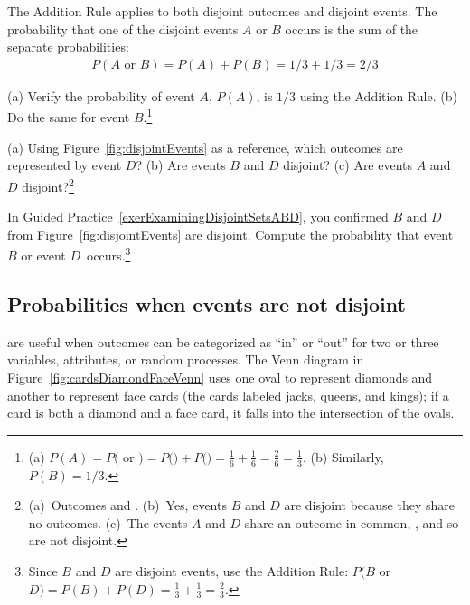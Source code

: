 The Addition Rule applies to both disjoint outcomes and disjoint events. The probability that one of the disjoint events $A$ or $B$ occurs is the sum of the separate probabilities:
\begin{align*}
P(A\text{ or }B) = P(A) + P(B) = 1/3 + 1/3 = 2/3
\end{align*}

\begin{exercise}
(a) Verify the probability of event $A$, $P(A)$, is $1/3$ using the Addition Rule. (b) Do the same for event $B$.\footnote{(a) $P(A) = P($ or $) = P($$) + P($$) = \frac{1}{6} + \frac{1}{6} = \frac{2}{6} = \frac{1}{3}$. (b) Similarly, $P(B) = 1/3$.}
\end{exercise}

\begin{exercise} \label{exerExaminingDisjointSetsABD}
(a) Using Figure~\ref{fig:disjointEvents} as a reference, which outcomes are represented by event $D$? (b) Are events $B$ and $D$ disjoint? (c) Are events $A$ and $D$ disjoint?\footnote{(a)~Outcomes  and . (b)~Yes, events $B$ and $D$ are disjoint because they share no outcomes. (c)~The events $A$ and $D$ share an outcome in common, , and so are not disjoint.}
\end{exercise}

\begin{exercise}
In Guided Practice~\ref{exerExaminingDisjointSetsABD}, you confirmed $B$ and $D$ from Figure~\ref{fig:disjointEvents} are disjoint. Compute the probability that event $B$ or event $D$~occurs.\footnote{Since $B$ and $D$ are disjoint events, use the Addition Rule: $P(B$ or $D) = P(B) + P(D) = \frac{1}{3} + \frac{1}{3} = \frac{2}{3}$.}
\end{exercise}



\subsection{Probabilities when events are not disjoint}

 are useful when outcomes can be categorized as ``in'' or ``out'' for two or three variables, attributes, or random processes. The Venn diagram in Figure~\ref{fig:cardsDiamondFaceVenn} uses one oval to represent diamonds and another to represent face cards (the cards labeled jacks, queens, and kings); if a card is both a diamond and a face card, it falls into the intersection of the ovals.


